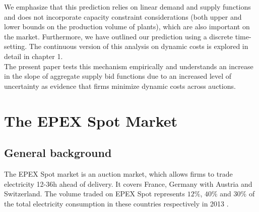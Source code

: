 We emphasize that this prediction relies on linear demand and supply functions and does not incorporate capacity constraint considerations (both upper and lower bounds on the production volume of plants), which are also important on the market. Furthermore, we have outlined our prediction using a discrete time-setting. The continuous version of this analysis on dynamic costs is explored in detail in chapter 1.\\ 

The present paper tests this mechanism empirically and understands an increase in the slope of aggregate supply bid functions due to an increased level of uncertainty as evidence that firms minimize dynamic costs across auctions. 

\section{The EPEX Spot Market}
\label{epexall}
\subsection{General background}
\label{epexbackground}
The EPEX Spot market is an auction market, which allows firms to trade electricity 12-36h ahead of delivery. It covers France, Germany with Austria and Switzerland. The volume traded on EPEX Spot represents $12\%$, $40\%$ and $30\%$ of the total electricity consumption in these countries respectively in 2013 \cite{epexwebsite1}.\\

